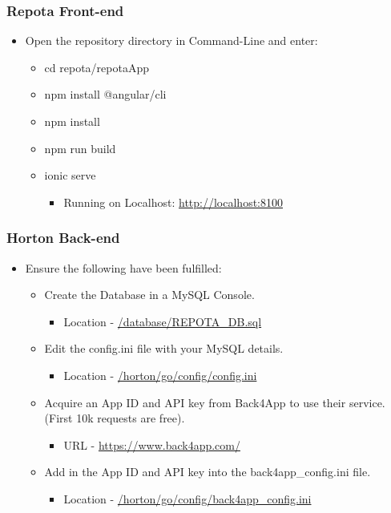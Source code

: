 \newpage
\subsubsection{Repota Front-end}
\begin{itemize}
  \item Open the repository directory in Command-Line and enter:
    \begin{itemize}
    \item cd repota/repotaApp
    \item npm install @angular/cli
    \item npm install
    \item npm run build
    \item ionic serve
    \begin{itemize}
        \item Running on Localhost: \url{http://localhost:8100}
    \end{itemize}
    \end{itemize}
\end{itemize}

\subsubsection{Horton Back-end}
\begin{itemize}
  \item Ensure the following have been fulfilled:
    \begin{itemize}
    \item Create the Database in a MySQL Console.
        \begin{itemize}
            \item Location - \url{/database/REPOTA_DB.sql}
        \end{itemize}
    \item Edit the config.ini file with your MySQL details.
        \begin{itemize}
            \item Location - \url{/horton/go/config/config.ini}
        \end{itemize}
    \item Acquire an App ID and API key from Back4App to use their service. (First 10k requests are free).
        \begin{itemize}
            \item URL - \url{https://www.back4app.com/}
        \end{itemize}
    \item Add in the App ID and API key into the back4app\_config.ini file.
        \begin{itemize}
            \item Location - \url{/horton/go/config/back4app_config.ini}
        \end{itemize}
    \end{itemize}
\end{itemize}

